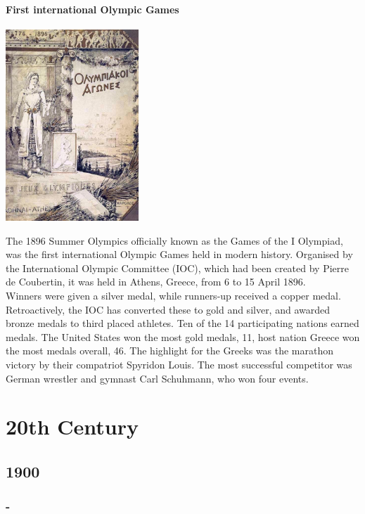 \documentclass[11pt]{report}
\begin{document}
\subsection{First international Olympic Games}
\vspace{2mm}\begin{center}\includegraphics[width=5cm]{./img/olgames.jpg}\end{center}
The 1896 Summer Olympics officially known as the Games of the I Olympiad, was the first international Olympic Games held in modern history. Organised by the International Olympic Committee (IOC), which had been created by Pierre de Coubertin, it was held in Athens, Greece, from 6 to 15 April 1896.\\
Winners were given a silver medal, while runners-up received a copper medal. Retroactively, the IOC has converted these to gold and silver, and awarded bronze medals to third placed athletes. Ten of the 14 participating nations earned medals. The United States won the most gold medals, 11, host nation Greece won the most medals overall, 46. The highlight for the Greeks was the marathon victory by their compatriot Spyridon Louis. The most successful competitor was German wrestler and gymnast Carl Schuhmann, who won four events.

					
\part{20th Century}
\chapter{1900}
\section{-}
\end{document}
